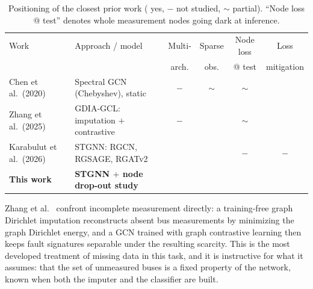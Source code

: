 \documentclass[3p,times,procedia]{elsarticle}
\newcommand{\yes}{\checkmark}
\newcommand{\no}{\ensuremath{-}}
\newcommand{\pt}{\ensuremath{\sim}}
\begin{document}
\begin{table}[!t]
  \centering
  \caption{Positioning of the closest prior work (\yes{} yes, \no{} not studied,
           \pt{} partial). ``Node loss @ test'' denotes whole measurement nodes
           going dark at inference.}
  \label{tab:related}
  \footnotesize
  \setlength{\tabcolsep}{4pt}
  \begin{tabular}{@{}llcccc@{}}
    \toprule
    Work & Approach / model
         & Multi- & Sparse & Node loss & Loss \\
         &
         & arch.  & obs.    & @ test   & mitigation \\
    \midrule
    Chen et al.\ (2020) \cite{chen2020}
      & Spectral GCN (Chebyshev), static
      & \no & \pt & \pt & \yes \\
    Zhang et al.\ (2025) \cite{zhang2025}
      & GDIA-GCL: imputation $+$ contrastive
      & \no & \yes & \pt & \yes \\
    Karabulut et al.\ (2026) \cite{Karabulut2026}
      & STGNN: RGCN, RGSAGE, RGATv2
      & \yes & \yes & \no & \no \\
    \textbf{This work}
      & \textbf{STGNN $+$ node drop-out study}
      & \yes & \yes & \yes & \yes \\
    \bottomrule
  \end{tabular}
\end{table}

Zhang et al.~\cite{zhang2025} confront incomplete measurement directly: a training-free graph Dirichlet imputation reconstructs absent bus measurements by minimizing the graph Dirichlet energy, and a GCN trained with graph contrastive learning then keeps fault signatures separable under the resulting scarcity. This is the most developed treatment of missing data in this task, and it is instructive for what it assumes: that the set of unmeasured buses is a fixed property of the network, known when both the imputer and the classifier are built.
\end{document}
